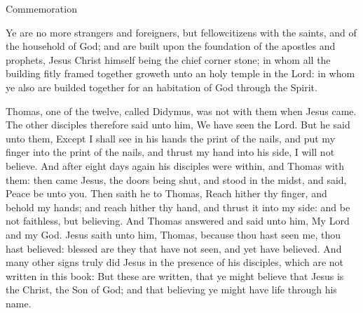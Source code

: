 \begin{rubric}
    Commemoration 
\end{rubric}

 Ye are no more strangers and foreigners, but fellowcitizens with the saints, and of the household of God; and are built upon the foundation of the apostles and prophets, Jesus Christ himself being the chief corner stone; in whom all the building fitly framed together groweth unto an holy temple in the Lord: in whom ye also are builded together for an habitation of God through the Spirit.



 Thomas, one of the twelve, called Didymus, was not with them when Jesus came. The other disciples therefore said unto him, We have seen the Lord. But he said unto them, Except I shall see in his hands the print of the nails, and put my finger into the print of the nails, and thrust my hand into his side, I will not believe. And after eight days again his disciples were within, and Thomas with them: then came Jesus, the doors being shut, and stood in the midst, and said, Peace be unto you. Then saith he to Thomas, Reach hither thy finger, and behold my hands; and reach hither thy hand, and thrust it into my side: and be not faithless, but believing. And Thomas answered and said unto him, My Lord and my God. Jesus saith unto him, Thomas, because thou hast seen me, thou hast believed: blessed are they that have not seen, and yet have believed. And many other signs truly did Jesus in the presence of his disciples, which are not written in this book: But these are written, that ye might believe that Jesus is the Christ, the Son of God; and that believing ye might have life through his name.

